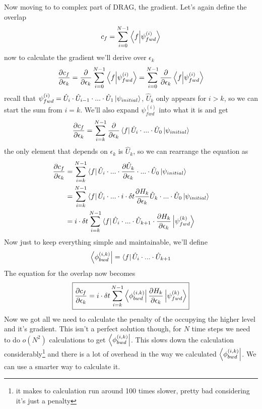 Now moving to to complex part of DRAG, the gradient. Let's again define the overlap
\[
    c_{f} = \sum_{i=0}^{N - 1} \braket{f}{\psi_{fwd}^{ (i)}}
\]
now to calculate the gradient we'll derive over $\epsilon_k$
\[
    \frac{\partial c_{f}}{\partial \epsilon_k} = \frac{\partial}{\partial \epsilon_k}\sum_{i=0}^{N - 1}  \braket{f}{\psi_{fwd}^{ (i)}} = \sum_{i=0}^{N - 1} \frac{\partial}{\partial \epsilon_k} \braket{f}{\psi_{fwd}^{ (i)}}
\]
recall that $\psi_{fwd}^{ (i)} = \hat{U}_i \cdot \hat{U}_{i-1} \cdot ... \cdot \hat{U}_1 \ket{\psi_{initial}}$, $\hat{U}_k$ only appears for $i > k$, so we can start the sum from $i = k$. We'll also expand $\psi_{fwd}^{ (i)}$ into what it is and get
\[
    \frac{\partial c_{f}}{\partial \epsilon_k} = \sum_{i=k}^{N - 1} \frac{\partial}{\partial \epsilon_k} \bra{f}\hat{U}_i \cdot ... \cdot \hat{U}_0 \ket{\psi_{initial}}
\]
the only element that depends on $\epsilon_k$ is $\hat{U}_k$, so we can rearrange the equation as
\begin{align*}
    \frac{\partial c_{f}}{\partial \epsilon_k} &= \sum_{i=k}^{N - 1} \bra{f}\hat{U}_i \cdot ...\cdot \frac{\partial \hat{U}_k}{\partial \epsilon_k} \cdot ... \cdot \hat{U}_0 \ket{\psi_{initial}} \\
    &= \sum_{i=k}^{N - 1} \bra{f}\hat{U}_i \cdot ...\cdot i \cdot \delta t\frac{\partial H_k}{\partial \epsilon_k} \hat{U}_k\cdot ... \cdot \hat{U}_0 \ket{\psi_{initial}} \\
    &= i \cdot \delta t \sum_{i=k}^{N - 1} \bra{f}\hat{U}_i \cdot ... \cdot \hat{U}_{k+1} \cdot \frac{\partial H_k}{\partial \epsilon_k}\ket{\psi_{fwd}^{ (k)}}
\end{align*}
Now just to keep everything simple and maintainable, we'll define
\[
    \bra{\phi_{bwd}^{ (i,k)}} = \bra{f} \hat{U}_i \cdot ... \cdot \hat{U}_{k+1}
\]
The equation for the overlap now becomes
\[
    \boxed{\frac{\partial c_{f}}{\partial \epsilon_k} = i \cdot \delta t \sum_{i=k}^{N - 1} \bra{\phi_{bwd}^{ (i,k)}} \frac{\partial H_k}{\partial \epsilon_k} \ket{\psi_{fwd}^{ (k)}}}
\]
Now we got all we need to calculate the penalty of the occupying the higher level and it's gradient. This isn't a perfect solution though, for $N$ time steps we need to do $o (N^2)$ calculations to get $\bra{\phi_{bwd}^{ (i,k)}}$. This slows down the calculation considerably\footnote{it makes to calculation run around 100 times slower, pretty bad considering it's just a penalty} and there is a lot of overhead in the way we calculated $\bra{\phi_{bwd}^{ (i,k)}}$. We can use a smarter way to calculate it.

